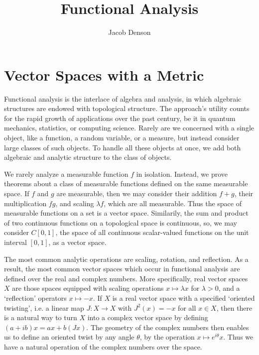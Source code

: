 


\title{Functional Analysis}
\author{Jacob Denson}



\maketitle
\tableofcontents
{}

\part{Vector Spaces with a Metric}

Functional analysis is the interlace of algebra and analysis, in which algebraic structures are endowed with topological structure. The approach's utility counts for the rapid growth of applications over the past century, be it in quantum mechanics, statistics, or computing science. Rarely are we concerned with a single object, like a function, a random variable, or a measure, but instead consider large classes of such objects. To handle all these objects at once, we add both algebraic and analytic structure to the class of objects.

\begin{example}
    We rarely analyze a measurable function $f$ in isolation. Instead, we prove theorems about a class of measurable functions defined on the same measurable space. If $f$ and $g$ are measurable, then we may consider their addition $f + g$, their multiplication $fg$, and scaling $\lambda f$, which are all measurable. Thus the space of measurable functions on a set is a vector space. Similarily, the sum and product of two continuous functions on a topological space is continuous, so, we may consider $C[0,1]$, the space of all continuous scalar-valued functions on the unit interval $[0,1]$, as a vector space.
\end{example}

The most common analytic operations are scaling, rotation, and reflection. As a result, the most common vector spaces which occur in functional analysis are defined over the real and complex numbers. More specifically, real vector spaces $X$ are those spaces equipped with scaling operations $x \mapsto \lambda x$ for $\lambda > 0$, and a `reflection' operators $x \mapsto -x$. If $X$ is a real vector space with a specified `oriented twisting', i.e. a linear map $J: X \to X$ with $J^2(x) = -x$ for all $x \in X$, then there is a natural way to turn $X$ into a complex vector space by defining $(a + ib)x = ax + b(Jx)$. The geometry of the complex numbers then enables us to define an oriented twist by any angle $\theta$, by the operation $x \mapsto e^{i\theta} x$. Thus we have a natural operation of the complex numbers over the space.





